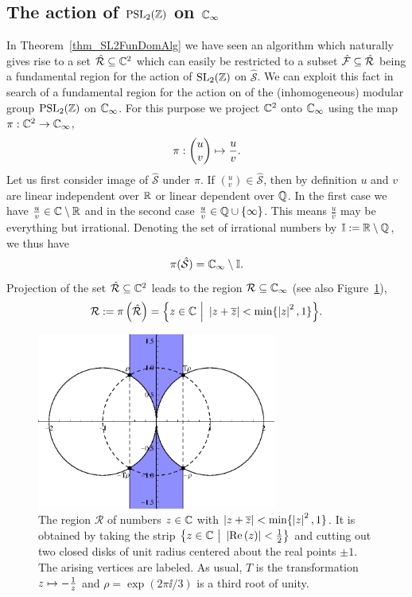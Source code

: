 \subsection{The action of $\operatorname{PSL}_{2}(\mathbb{Z})$ on $\mathbb{C}_{\infty}$}

In Theorem~\ref{thm_SL2FunDomAlg} we have seen an algorithm which naturally gives rise to a set $\hat{\mathcal{R}} \subseteq \mathbb{C}^2$ which can easily be restricted to a subset $\hat{\mathcal{F}} \subseteq \hat{\mathcal{R}}$ being a fundamental region for the action of $\operatorname{SL}_{2}(\mathbb{Z})$ on $\hat{\mathcal{S}}$. We can exploit this fact in search of a fundamental region for the action on of the (inhomogeneous) modular group $\operatorname{PSL}_{2}(\mathbb{Z})$ on $\mathbb{C}_{\infty}$. For this purpose we project $\mathbb{C}^2$ onto $\mathbb{C}_{\infty}$ using the map $\pi : \mathbb{C}^2 \to \mathbb{C}_{\infty}$,
\begin{equation}
\pi : \begin{pmatrix}u \\ v\end{pmatrix} \mapsto \frac{u}{v}.
\end{equation}
Let us first consider image of $\hat{\mathcal{S}}$ under $\pi$. If $({}^u_v) \in \hat{\mathcal{S}}$, then by definition $u$ and $v$ are linear independent over $\mathbb{R}$ or linear dependent over $\mathbb{Q}$. In the first case we have $\frac{u}{v} \in \mathbb{C} \setminus \mathbb{R}$ and in the second case $\frac{u}{v} \in \mathbb{Q} \cup \{\infty\}$. This means $\frac{u}{v}$ may be everything but irrational. Denoting the set of irrational numbers by $\mathbb{I} := \mathbb{R} \setminus \mathbb{Q}$, we thus have
\begin{equation*}
\pi(\hat{\mathcal{S}}) = \mathbb{C}_{\infty} \setminus \mathbb{I}.
\end{equation*}
Projection of the set $\hat{\mathcal{R}} \subseteq \mathbb{C}^2$ leads to the region $\mathcal{R} \subseteq \EC$ (see also Figure~\ref{fig_PSL2MinRegion}),
\begin{equation}
\label{eqn_PSL2MinRegion}
\mathcal{R} := \pi\left(\hat{\mathcal{R}}\right) = 
\Big\{ z \in \mathbb{C} \ \Big| \ \left|z + \overline{z}\right| < \min\{\left|z\right|^2, 1\} \Big\}.
\end{equation}
\begin{figure}
\centering
\includegraphics[width=0.7\textwidth]{figures/minimal-region}
\caption[The region $\mathcal{R} \subseteq \EC$]{The region $\mathcal{R}$ of numbers $z \in \mathbb{C}$ with $\left|z + \overline{z}\right| < \min\{\left|z\right|^2, 1\}$. It is obtained by taking the strip $\big\{ z \in \mathbb{C} \ \big| \ \left|\operatorname{Re}\left(z\right)\right| < \frac{1}{2} \big\}$  and cutting out two closed disks of unit radius centered about the real points $\pm 1$. The arising vertices are labeled. As usual, $T$ is the transformation $z \mapsto -\frac{1}{z}$ and $\rho = \exp(2 \pi \ii / 3)$ is a third root of unity.}
\label{fig_PSL2MinRegion}
\end{figure}
